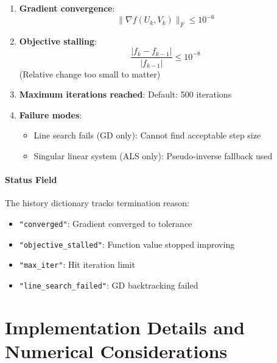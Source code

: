 \documentclass[11pt,oneside]{article}
\newcommand{\grad}{\nabla}
\begin{document}
\begin{enumerate}
    \item \textbf{Gradient convergence}:
    \begin{equation}
        \|\grad f(U_k, V_k)\|_F \leq 10^{-6}
    \end{equation}
    
    \item \textbf{Objective stalling}:
    \begin{equation}
        \frac{|f_k - f_{k-1}|}{|f_{k-1}|} \leq 10^{-8}
    \end{equation}
    (Relative change too small to matter)
    
    \item \textbf{Maximum iterations reached}: Default: 500 iterations
    
    \item \textbf{Failure modes}:
    \begin{itemize}
        \item Line search fails (GD only): Cannot find acceptable step size
        \item Singular linear system (ALS only): Pseudo-inverse fallback used
    \end{itemize}
\end{enumerate}

\paragraph{Status Field}

The history dictionary tracks termination reason:
\begin{itemize}
    \item \texttt{"converged"}: Gradient converged to tolerance
    \item \texttt{"objective\_stalled"}: Function value stopped improving
    \item \texttt{"max\_iter"}: Hit iteration limit
    \item \texttt{"line\_search\_failed"}: GD backtracking failed
\end{itemize}

\section{Implementation Details and Numerical Considerations}\label{sec:implementation}
\end{document}
